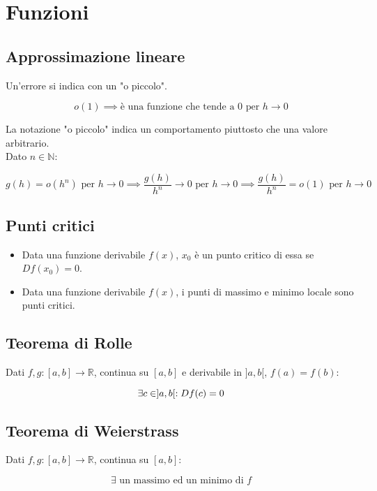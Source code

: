 \documentclass{subfiles}
\begin{document}
\section{Funzioni}

\subsection{Approssimazione lineare}

Un'errore si indica con un "o piccolo".

$$
o(1) \implies \text{è una funzione che tende a 0 per } h \to 0
$$

\noindent
La notazione "o piccolo" indica un comportamento piuttosto che una valore arbitrario.\\

\noindent
Dato $n \in \mathbb{N}$:

$$
g(h) = o(h^n) \text{ per } h \to 0 \implies
\frac{g(h)}{h^n} \to 0 \text{ per } h \to 0 \implies
\frac{g(h)}{h^n} = o(1) \text{ per } h \to 0
$$

\subsection{Punti critici}

\begin{itemize}
    \item Data una funzione derivabile $f(x)$, $x_0$ è un punto critico di essa se $Df(x_0) = 0$.
    \item Data una funzione derivabile $f(x)$, i punti di massimo e minimo locale sono punti critici.
\end{itemize}

\subsection{Teorema di Rolle}

Dati $f,g : [a,b] \to \mathbb{R}$, continua su $[a,b]$ e derivabile in $]a,b[$,  $f(a) = f(b)$:

$$
\exists \space c \in \space ]a,b[ \space : Df(c) = 0
$$

\subsection{Teorema di Weierstrass}

Dati $f,g : [a,b] \to \mathbb{R}$, continua su $[a,b]$:

$$
\exists \text{ un massimo ed un minimo di }f
$$
\end{document}
